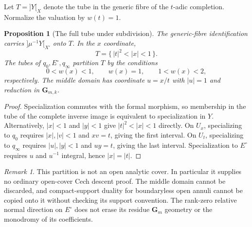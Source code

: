 \documentclass[11pt]{article}
\newtheorem{proposition}[theorem]{Proposition}
\theoremstyle{definition}
\theoremstyle{remark}
\newtheorem{remark}[theorem]{Remark}
\begin{document}
Let $T=]Y[_X$ denote the tube in the generic fibre of the $t$-adic
completion.  Normalize the valuation by $w(t)=1$.
\begin{proposition}[The full tube under subdivision]\label{prop:tubes}
The generic-fibre identification carries $]\mu^{-1}Y[_{X'}$ onto $T$.
In the $x$ coordinate,
\[
 T=\{\,|t|^2<|x|<1\,\}.
\]
The tubes of $q_0,E^\circ,q_\infty$ partition $T$ by the conditions
\[
 0<w(x)<1,\qquad w(x)=1,\qquad 1<w(x)<2,
\]
respectively.  The middle domain has coordinate $u=x/t$ with $|u|=1$
and reduction in $\mathbf G_{m,k}$.
\end{proposition}
\begin{proof}
Specialization commutes with the formal morphism, so membership in the
tube of the complete inverse image is equivalent to specialization in
$Y$.  Alternatively, $|x|<1$ and $|y|<1$ give $|t|^2<|x|<1$ directly.
On $U_x$, specializing to $q_0$ requires $|x|,|v|<1$ and $xv=t$, giving
the first interval.  On $U_t$, specializing to $q_\infty$ requires
$|u|,|y|<1$ and $uy=t$, giving the last interval.  Specialization to
$E^\circ$ requires $u$ and $u^{-1}$ integral, hence $|x|=|t|$.
\end{proof}
\begin{remark}
This partition is not an open analytic cover.  In particular it supplies
no ordinary open-cover Cech descent proof.  The middle domain cannot be
discarded, and compact-support duality for boundaryless open annuli
cannot be copied onto it without checking its support convention.
The rank-zero relative normal direction on $E^\circ$ does not erase its
residue $\mathbf G_m$ geometry or the monodromy of its coefficients.
\end{remark}
\end{document}
